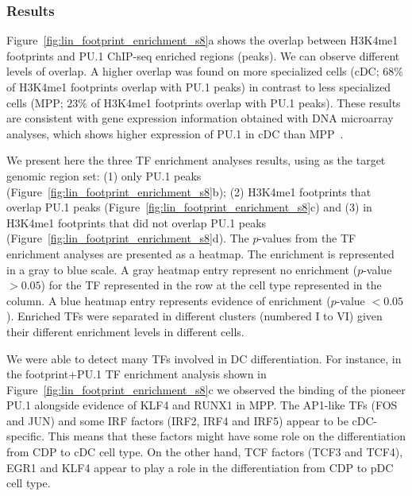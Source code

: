 \subsubsection{Results}

Figure~\ref{fig:lin_footprint_enrichment_s8}a shows the overlap between H3K4me1 footprints and PU.1 ChIP-seq enriched regions (peaks). We can observe different levels of overlap. A higher overlap was found on more specialized cells (cDC; \approxy$68\%$ of H3K4me1 footprints overlap with PU.1 peaks) in contrast to less specialized cells (MPP; \approxy$23\%$ of H3K4me1 footprints overlap with PU.1 peaks). These results are consistent with gene expression information obtained with DNA microarray analyses, which shows higher expression of PU.1 in cDC than MPP~\citep{lin2015}.

We present here the three TF enrichment analyses results, using as the target genomic region set: (1) only PU.1 peaks (Figure~\ref{fig:lin_footprint_enrichment_s8}b); (2) H3K4me1 footprints that overlap PU.1 peaks (Figure~\ref{fig:lin_footprint_enrichment_s8}c) and (3) in H3K4me1 footprints that did not overlap PU.1 peaks (Figure~\ref{fig:lin_footprint_enrichment_s8}d). The $p$-values from the TF enrichment analyses are presented as a heatmap. The enrichment is represented in a gray to blue scale. A gray heatmap entry represent no enrichment ($p$-value $> 0.05$) for the TF represented in the row at the cell type represented in the column. A blue heatmap entry represents evidence of enrichment ($p$-value $< 0.05$). Enriched TFs were separated in different clusters (numbered I to VI) given their different enrichment levels in different cells. 

We were able to detect many TFs involved in DC differentiation. For instance, in the footprint+PU.1 TF enrichment analysis shown in Figure~\ref{fig:lin_footprint_enrichment_s8}c we observed the binding of the pioneer PU.1 alongside evidence of KLF4 and RUNX1 in MPP. The AP1-like TFs (FOS and JUN) and some IRF factors (IRF2, IRF4 and IRF5) appear to be cDC-specific. This means that these factors might have some role on the differentiation from CDP to cDC cell type. On the other hand, TCF factors (TCF3 and TCF4), EGR1 and KLF4 appear to play a role in the differentiation from CDP to pDC cell type.

